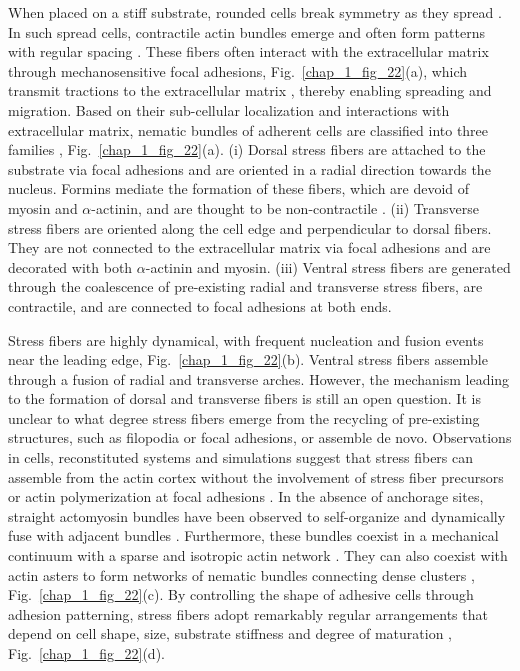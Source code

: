 When placed on a stiff substrate, rounded cells break symmetry as they spread \cite{gupta2015, rens2020,callan2008}.
In such spread cells, contractile actin bundles emerge and often form patterns with regular spacing \cite{jalal2019}. These fibers often interact with the extracellular matrix through mechanosensitive focal adhesions, Fig.~\ref{chap_1_fig_22}(a), which transmit tractions to the extracellular matrix \cite{tojkander2012,livne2016}, thereby enabling spreading and migration. Based on their sub-cellular localization and interactions
with extracellular matrix, nematic bundles of adherent cells are  classified into three families \cite{lehtimaki2021, tee2015, tojkander2015,wirshing2017, yolland2019, jalal2019}, Fig.~\ref{chap_1_fig_22}(a). (i) Dorsal stress fibers are attached to the substrate via focal adhesions and are oriented in a radial direction towards the nucleus. Formins mediate the formation of these fibers, which are devoid of myosin and $\alpha$-actinin, and are thought to be non-contractile \cite{lehtimaki2021}. (ii) Transverse stress fibers are oriented along the cell edge and perpendicular to dorsal fibers. They are not connected to the extracellular matrix via focal adhesions and are decorated with both $\alpha$-actinin and myosin. (iii) Ventral stress fibers are generated through the coalescence of pre-existing radial and transverse stress fibers, are contractile,  and are connected to focal adhesions at both ends.

Stress fibers are highly dynamical, with frequent nucleation and fusion events near the leading edge, Fig.~\ref{chap_1_fig_22}(b). Ventral stress fibers assemble through a fusion of radial and transverse arches. However, the mechanism leading to the formation of dorsal and transverse fibers is still an open question. It is unclear to what degree stress fibers emerge from the recycling of pre-existing structures, such as filopodia \cite{nemethova2008,doi:10.1091/mbc.e08-01-0034} or focal adhesions, or assemble de novo. Observations in cells,  reconstituted systems and simulations suggest that stress fibers can assemble from the actin cortex without the involvement of stress fiber precursors or actin polymerization at focal adhesions \cite{lehtimaki2021,livne2016,deshpande2015,freedman2018}. In the absence of anchorage sites, straight actomyosin bundles have been observed to self-organize and dynamically fuse with adjacent bundles \cite{lehtimaki2021,livne2016,wirshing2017}. Furthermore, these bundles coexist in a mechanical continuum with a sparse and isotropic actin network  \cite{vignaud2021}. They can also coexist with actin asters to form networks of nematic bundles connecting dense clusters \cite{jalal2019,xia2019}, Fig.~\ref{chap_1_fig_22}(c). By controlling the shape of adhesive cells through adhesion patterning, stress fibers adopt remarkably regular arrangements that depend on cell shape, size, substrate stiffness and degree of maturation \cite{10.1242/jcs.236604,jalal2019}, Fig.~\ref{chap_1_fig_22}(d). 


